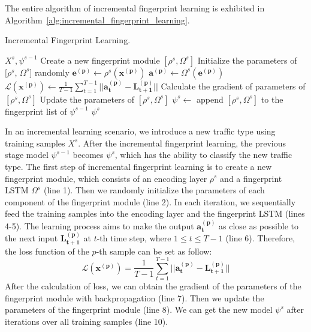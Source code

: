 The entire algorithm of incremental fingerprint learning is exhibited in Algorithm~\ref{alg:incremental_fingerprint_learning}.
\begin{algorithm}[H]
\caption{Incremental Fingerprint Learning.}
\label{alg:incremental_fingerprint_learning}
\renewcommand{\algorithmicrequire}{\textbf{Input:}}
\renewcommand{\algorithmicensure}{\textbf{Output:}}
\begin{algorithmic}[1]
\REQUIRE $X^s, \psi^{s-1}$
\STATE Create a new fingerprint module $[\rho^s, \Omega^s]$
\STATE Initialize the parameters of $[\rho^s$, $\Omega^s]$ randomly
	\STATE $\mathbf{e^{(p)}} \gets \rho^s(\mathbf{x^{(p)}}) $
	\STATE $\mathbf{a^{(p)}} \gets \Omega^s(\mathbf{e^{(p)}})$
	\STATE $\mathcal{L}(\mathbf{x^{(p)}}) \gets \frac{1}{T-1} \sum_{t=1}^{T-1}\vert\vert \mathbf{a_t^{(p)}} - \mathbf{L_{t+1}^{(p)}} \vert\vert $
	\STATE Calculate the gradient of parameters of $[\rho^s, \Omega^s]$
	\STATE Update the parameters of $[\rho^s, \Omega^s]$
\ENDFOR
\STATE $\psi^s \gets $ append $[\rho^s, \Omega^s]$ to the fingerprint list of $\psi^{s-1}$
\ENSURE $\psi^{s}$
\end{algorithmic}
\end{algorithm}

In an incremental learning scenario, we introduce a new traffic type using training samples $X^s$.
After the incremental fingerprint learning, the previous stage model $\psi^{s-1}$ becomes $\psi^s$, which has the ability to classify the new traffic type.
The first step of incremental fingerprint learning is to create a new fingerprint module, which consists of an encoding layer $\rho^s$ and a fingerprint LSTM $\Omega^s$ (line 1).
Then we randomly initialize the parameters of each component of the fingerprint module (line 2). 
In each iteration, we sequentially feed the training samples into the encoding layer and the fingerprint LSTM (lines 4-5). 
The learning process aims to make the output $\mathbf{a_t^{(p)}}$ as close as possible to the next input $\mathbf{L_{t+1}^{(p)}}$ at $t$-th time step,  where $1 \le t \le T-1 $ (line 6). 
Therefore, the loss function of the $p$-th sample can be set as follow: 
\begin{equation}\label{eq:lossfunction}
    \mathcal{L}(\mathbf{x^{(p)}}) = \frac{1}{T-1} \sum_{t=1}^{T-1}\vert\vert \mathbf{a_t^{(p)}} - \mathbf{L_{t+1}^{(p)}} \vert\vert
\end{equation}
After the calculation of loss, we can obtain the gradient of the parameters of the fingerprint module with backpropagation (line 7). 
Then we update the parameters of the fingerprint module (line 8).
We can get the new model $\psi^s$ after iterations over all training samples (line 10).

